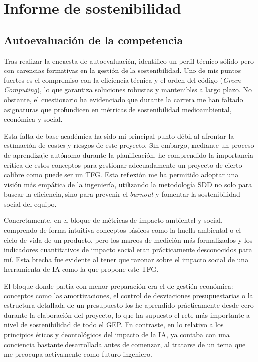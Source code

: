 \documentclass[11pt, letterpaper]{article}
\begin{document}
\section{Informe de sostenibilidad}

\subsection{Autoevaluación de la competencia}
Tras realizar la encuesta de autoevaluación, identifico un perfil técnico sólido pero con carencias formativas en la gestión de la sostenibilidad. Uno de mis puntos fuertes es el compromiso con la eficiencia técnica y el orden del código (\textit{Green Computing}), lo que garantiza soluciones robustas y mantenibles a largo plazo. No obstante, el cuestionario ha evidenciado que durante la carrera me han faltado asignaturas que profundicen en métricas de sostenibilidad medioambiental, económica y social.

Esta falta de base académica ha sido mi principal punto débil al afrontar la estimación de costes y riesgos de este proyecto. Sin embargo, mediante un proceso de aprendizaje autónomo durante la planificación, he comprendido la importancia crítica de estos conceptos para gestionar adecuadamente un proyecto de cierto calibre como puede ser un TFG. Esta reflexión me ha permitido adoptar una visión más empática de la ingeniería, utilizando la metodología SDD no solo para buscar la eficiencia, sino para prevenir el \textit{burnout} y fomentar la sostenibilidad social del equipo.

Concretamente, en el bloque de métricas de impacto ambiental y social, comprendo de forma intuitiva conceptos básicos como la huella ambiental o el ciclo de vida de un producto, pero los marcos de medición más formalizados y los indicadores cuantitativos de impacto social eran prácticamente desconocidos para mí. Esta brecha fue evidente al tener que razonar sobre el impacto social de una herramienta de IA como la que propone este TFG.

El bloque donde partía con menor preparación era el de gestión económica: conceptos como las amortizaciones, el control de desviaciones presupuestarias o la estructura detallada de un presupuesto los he aprendido prácticamente desde cero durante la elaboración del proyecto, lo que ha supuesto el reto más importante a nivel de sostenibilidad de todo el GEP. En contraste, en lo relativo a los principios éticos y deontológicos del impacto de la IA, ya contaba con una conciencia bastante desarrollada antes de comenzar, al tratarse de un tema que me preocupa activamente como futuro ingeniero.
\\
\end{document}
